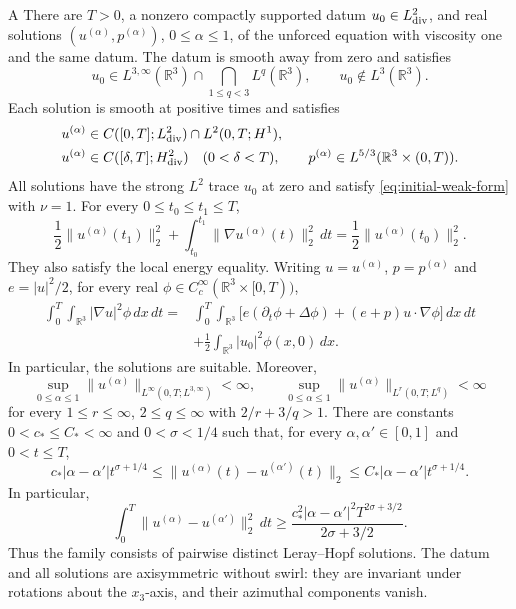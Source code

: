 \documentclass[11pt]{article}
\numberwithin{equation}{section}
\theoremstyle{definition}
\theoremstyle{remark}
\theoremstyle{plain}
\newcommand{\R}{\mathbb R}
\begin{document}
\begin{namedtheorem}{A}\label{thm:finite-energy-target}
There are
\(T>0\), a nonzero compactly supported datum \(u_0\in L^2_{\rm div}\),
and real solutions \((u^{(\alpha)},p^{(\alpha)})\), \(0\le\alpha\le1\),
of the unforced equation with viscosity one and the same datum. The datum
is smooth away from zero and satisfies
\[
 u_0\in L^{3,\infty}(\R^3)\cap\bigcap_{1\le q<3}L^q(\R^3),
 \qquad u_0\notin L^3(\R^3).
\]
Each solution is smooth at positive times and satisfies
\[
 \begin{aligned}
 u^{(\alpha)}&\in C([0,T];L^2_{\rm div})\cap L^2(0,T;H^1),\\
 u^{(\alpha)}&\in C([\delta,T];H^2_{\rm div})\quad(0<\delta<T),\qquad
 p^{(\alpha)}\in L^{5/3}(\R^3\times(0,T)).
 \end{aligned}
\]
All solutions have the strong \(L^2\) trace \(u_0\) at zero and
satisfy \eqref{eq:initial-weak-form} with \(\nu=1\). For every
\(0\le t_0\le t_1\le T\),
\[
 \frac12\|u^{(\alpha)}(t_1)\|_2^2+
 \int_{t_0}^{t_1}\|\nabla u^{(\alpha)}(t)\|_2^2\,dt
 =\frac12\|u^{(\alpha)}(t_0)\|_2^2.
\]
They also satisfy the local energy equality. Writing
$u=u^{(\alpha)}$, $p=p^{(\alpha)}$ and $e=|u|^2/2$, for every real
$\phi\in C_c^\infty(\R^3\times[0,T))$,
\begin{equation}\label{short-loc:local-energy}
 \begin{aligned}
 \int_0^T\!\int_{\R^3}|\nabla u|^2\phi\,dx\,dt
 ={}&\int_0^T\!\int_{\R^3}
       \bigl[e(\partial_t\phi+\Delta\phi)
                    +(e+p)u\cdot\nabla\phi\bigr]\,dx\,dt\\
 &+\frac12\int_{\R^3}|u_0|^2\phi(x,0)\,dx.
 \end{aligned}
\end{equation}
In particular, the solutions are suitable. Moreover,
\[
 \sup_{0\le\alpha\le1}\|u^{(\alpha)}\|_{L^\infty(0,T;L^{3,\infty})}<\infty,
 \qquad
 \sup_{0\le\alpha\le1}\|u^{(\alpha)}\|_{L^r(0,T;L^q)}<\infty
\]
for every $1\le r\le\infty$, $2\le q\le\infty$ with $2/r+3/q>1$.
There are constants $0<c_*\le C_*<\infty$ and $0<\sigma<1/4$ such that,
for every $\alpha,\alpha'\in[0,1]$ and $0<t\le T$,
\[
 c_*|\alpha-\alpha'|t^{\sigma+1/4}
 \le\|u^{(\alpha)}(t)-u^{(\alpha')}(t)\|_2
 \le C_*|\alpha-\alpha'|t^{\sigma+1/4}.
\]
In particular,
\[
 \int_0^T\|u^{(\alpha)}-u^{(\alpha')}\|_2^2\,dt
 \ge\frac{c_*^2|\alpha-\alpha'|^2T^{2\sigma+3/2}}{2\sigma+3/2}.
\]
Thus the family consists of pairwise distinct Leray--Hopf solutions.
The datum and all solutions are axisymmetric without swirl: they are
invariant under rotations about the \(x_3\)-axis, and their azimuthal
components vanish.
\end{namedtheorem}
\end{document}
